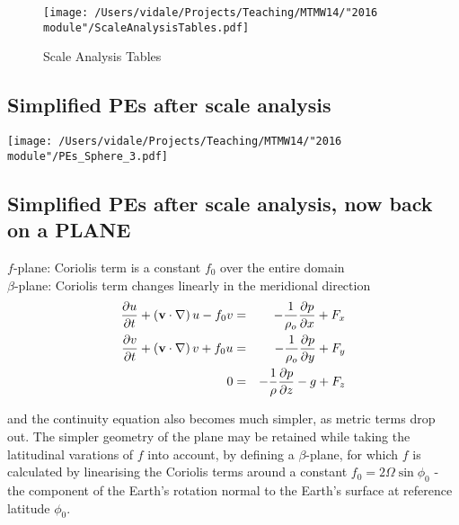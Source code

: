\begin{figure}
	\texttt{[image: /Users/vidale/Projects/Teaching/MTMW14/"2016 module"/ScaleAnalysisTables.pdf]}
	\label{fig:Spherical}
	\caption{\label{fig:blue_rectangle} \tiny Scale Analysis Tables}
\end{figure}

\subsection{Simplified PEs after scale analysis}

\texttt{[image: /Users/vidale/Projects/Teaching/MTMW14/"2016 module"/PEs\_Sphere\_3.pdf]}
\label{fig:Spherical-PEs1}


\subsection{Simplified PEs after scale analysis, now back on a PLANE}

$f$-plane: Coriolis term is a constant $f_0$ over the entire domain\\
$\beta$-plane: Coriolis term changes linearly in the meridional direction\\

\begin{eqnarray}
	\frac{\partial u}{\partial t} + \left( \mathbf{v} \cdot \nabla\right) u - f_0 v & = & -\frac{1}{\rho_o}\frac{\partial p}{\partial x} +F_x \\
	\frac{\partial v}{\partial t} + \left( \mathbf{v} \cdot \nabla\right) v + f_0 u & = & -\frac{1}{\rho_o}\frac{\partial p}{\partial y} +F_y \\
	0 & = & - \frac{1}{\rho} \frac{\partial p}{\partial z} - g + F_z
\end{eqnarray}

and the continuity equation also becomes much simpler, as metric terms drop out. The simpler geometry of the plane may be retained while taking the latitudinal varations of $f$ into account, by defining a $\beta$-plane, for which $f$ is calculated by linearising the Coriolis terms around a constant $f_0=2\Omega \sin\phi_0$ -
the component of the Earth's rotation normal to the Earth's surface at
reference latitude $\phi_0$. 	




